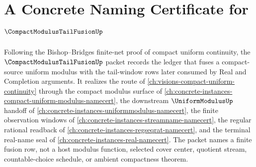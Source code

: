 \chapter{A Concrete Naming Certificate for $\CompactModulusTailFusionUp$}
\label{ch:concrete-instances-compact-modulus-tail-fusion-namecert}

Following the Bishop--Bridges finite-net proof of compact uniform continuity, the $\CompactModulusTailFusionUp$ packet records the ledger that fuses a compact-source uniform modulus with the tail-window rows later consumed by Real and Completion arguments. It realizes the route of \autoref{ch:visions-compact-uniform-continuity} through the compact modulus surface of \autoref{ch:concrete-instances-compact-uniform-modulus-namecert}, the downstream $\UniformModulusUp$ handoff of \autoref{ch:concrete-instances-uniformmodulus-namecert}, the finite observation windows of \autoref{ch:concrete-instances-streamname-namecert}, the regular rational readback of \autoref{ch:concrete-instances-regseqrat-namecert}, and the terminal real-name seal of \autoref{ch:concrete-instances-real-namecert}. The packet names a finite fusion row, not a host modulus function, selected cover center, quotient stream, countable-choice schedule, or ambient compactness theorem.

